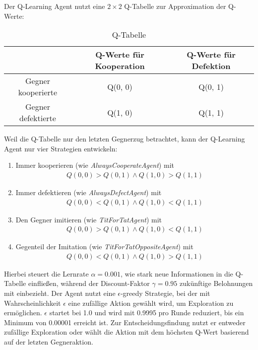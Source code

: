 Der Q-Learning Agent nutzt eine $2 \times 2$ Q-Tabelle zur Approximation der Q-Werte:
\begin{table}[H]
    \centering
    \begin{tabular}{c|c|c}
            & Q-Werte für Kooperation & Q-Werte für Defektion \\
        \hline
        Gegner kooperierte &  Q(0, 0) & Q(0, 1) \\
        \hline
        Gegner defektierte &  Q(1, 0) & Q(1, 1) \\
    \end{tabular}
    \caption{Q-Tabelle}
    \label{table:qtable}
\end{table}
Weil die Q-Tabelle nur den letzten Gegnerzug betrachtet, kann der Q-Learning Agent nur vier Strategien entwickeln:
\begin{enumerate}
    \item Immer kooperieren (wie \textit{AlwaysCooperateAgent}) mit
        \begin{align*}
            Q(0, 0) > Q(0, 1) \land Q(1, 0) > Q(1, 1)
        \end{align*}
    \item Immer defektieren (wie \textit{AlwaysDefectAgent}) mit
        \begin{align*}
            Q(0, 0) < Q(0, 1) \land Q(1, 0) < Q(1, 1)
        \end{align*} 
    \item Den Gegner imitieren (wie \textit{TitForTatAgent}) mit
        \begin{align*}
            Q(0, 0) > Q(0, 1) \land Q(1, 0) < Q(1, 1)
        \end{align*}
    \item Gegenteil der Imitation (wie \textit{TitForTatOppositeAgent}) mit
        \begin{align*}
            Q(0, 0) < Q(0, 1) \land Q(1, 0) > Q(1, 1)
        \end{align*}
\end{enumerate}
Hierbei steuert die Lernrate $\alpha=0.001$, wie stark neue Informationen in die Q-Tabelle einfließen, während der 
Discount-Faktor $\gamma=0.95$ zukünftige Belohnungen mit einbezieht. Der Agent nutzt eine $\epsilon$-greedy Strategie, 
bei der mit Wahrscheinlichkeit $\epsilon$ eine zufällige Aktion gewählt wird, um Exploration zu ermöglichen. 
$\epsilon$ startet bei 1.0 und wird mit 0.9995 pro Runde reduziert, bis ein Minimum von 0.00001 erreicht ist. 
Zur Entscheidungsfindung nutzt er entweder zufällige
Exploration oder wählt die Aktion mit dem höchsten Q-Wert basierend auf der letzten Gegneraktion. \\

